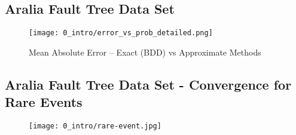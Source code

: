 
\subsection{Aralia Fault Tree Data Set}
\begin{frame}[allowframebreaks]
    
\end{frame}


\begin{frame}[allowframebreaks]
    \begin{figure}[h]
    \centering
    \texttt{[image: 0\_intro/error\_vs\_prob\_detailed.png]}
    \caption{Mean Absolute Error – Exact (BDD) vs Approximate Methods}
    \label{fig:mae_vs_logp}
\end{figure}
\end{frame}

\subsection{Aralia Fault Tree Data Set - Convergence for Rare Events}
\begin{frame}[allowframebreaks]
    
\end{frame}

\begin{frame}[allowframebreaks]
    \begin{figure}[h]
    \centering
    \texttt{[image: 0\_intro/rare-event.jpg]}
    \label{fig:rare}
\end{figure}
\end{frame}